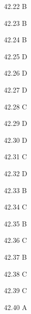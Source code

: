 \begin{Solution}{42.{22}}
B
\end{Solution}
\begin{Solution}{42.{23}}
B
\end{Solution}
\begin{Solution}{42.{24}}
B
\end{Solution}
\begin{Solution}{42.{25}}
D
\end{Solution}
\begin{Solution}{42.{26}}
D
\end{Solution}
\begin{Solution}{42.{27}}
D
\end{Solution}
\begin{Solution}{42.{28}}
C
\end{Solution}
\begin{Solution}{42.{29}}
D
\end{Solution}
\begin{Solution}{42.{30}}
D
\end{Solution}
\begin{Solution}{42.{31}}
C
\end{Solution}
\begin{Solution}{42.{32}}
D
\end{Solution}
\begin{Solution}{42.{33}}
B
\end{Solution}
\begin{Solution}{42.{34}}
C
\end{Solution}
\begin{Solution}{42.{35}}
B
\end{Solution}
\begin{Solution}{42.{36}}
C
\end{Solution}
\begin{Solution}{42.{37}}
B
\end{Solution}
\begin{Solution}{42.{38}}
C
\end{Solution}
\begin{Solution}{42.{39}}
C
\end{Solution}
\begin{Solution}{42.{40}}
A
\end{Solution}
